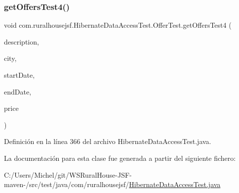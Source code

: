 \subsubsection{\texorpdfstring{getOffersTest4()}{getOffersTest4()}}
{\footnotesize\ttfamily void com.\+ruralhousejsf.\+Hibernate\+Data\+Access\+Test.\+Offer\+Test.\+get\+Offers\+Test4 (\begin{DoxyParamCaption}\item[{String}]{description,  }\item[{String}]{city,  }\item[{@Java\+Time\+Conversion\+Pattern(\char`\"{}dd/MM/yyyy\char`\"{}) Local\+Date}]{start\+Date,  }\item[{@Java\+Time\+Conversion\+Pattern(\char`\"{}dd/MM/yyyy\char`\"{}) Local\+Date}]{end\+Date,  }\item[{double}]{price }\end{DoxyParamCaption})\hspace{0.3cm}{\ttfamily [package]}}



Definición en la línea 366 del archivo Hibernate\+Data\+Access\+Test.\+java.



La documentación para esta clase fue generada a partir del siguiente fichero\+:\begin{DoxyCompactItemize}
\item 
C\+:/\+Users/\+Michel/git/\+W\+S\+Rural\+House-\/\+J\+S\+F-\/maven-\//src/test/java/com/ruralhousejsf/\mbox{\hyperlink{_hibernate_data_access_test_8java}{Hibernate\+Data\+Access\+Test.\+java}}\end{DoxyCompactItemize}
